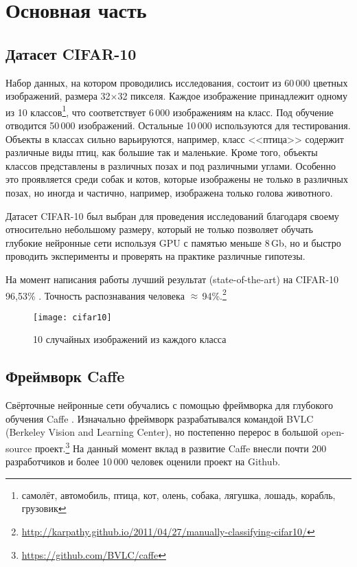 \section{Основная часть}
\subsection{Датасет CIFAR-10}
Набор данных, на котором проводились исследования, состоит из 60\,000 цветных изображений, размера 
32$\times$32 пикселя. Каждое изображение принадлежит одному из 10 классов\footnote{самолёт, автомобиль, птица,
кот, олень, собака, лягушка, лошадь, корабль, грузовик}, что соответствует 6\,000 изображениям на класс. Под 
обучение отводится 50\,000 изображений. Остальные 10\,000 используются для тестирования. Объекты в классах сильно варьируются, 
например, класс <<птица>> содержит различные виды птиц, как большие так и маленькие. Кроме того, объекты классов представлены в 
различных позах и под различными углами. Особенно это проявляется среди собак и котов, которые изображены не только в различных 
позах, но иногда и частично, например, изображена только голова животного.

Датасет CIFAR-10 \cite{learningmultiple} был выбран для проведения исследований благодаря своему относительно небольшому размеру, 
который не только позволяет обучать глубокие нейронные сети используя GPU с памятью меньше 8\,Gb, но и быстро проводить эксперименты
и проверять на практике различные гипотезы.

На момент написания работы лучший результат (state-of-the-art) на CIFAR-10 96,53\% \cite{2014arXiv1412}. Точность  
распознавания человека $\approx$\,94\%.\footnote{\url{http://karpathy.github.io/2011/04/27/manually-classifying-cifar10/}}

\begin{figure}[h]
\centering
\texttt{[image: cifar10]}
\caption{10 случайных изображений из каждого класса}
\end{figure}

\subsection{Фреймворк Caffe}
Свёрточные нейронные сети обучались с помощью фреймворка для глубокого обучения Caffe \cite{jia2014caffe}.
Изначально фреймворк разрабатывался командой BVLC (Berkeley Vision and Learning Center), но постепенно перерос в большой 
open-source проект.\footnote{\url{https://github.com/BVLC/caffe}} На данный момент вклад в развитие Caffe внесли почти 200 
разработчиков и более 10\,000 человек оценили проект на Github.

